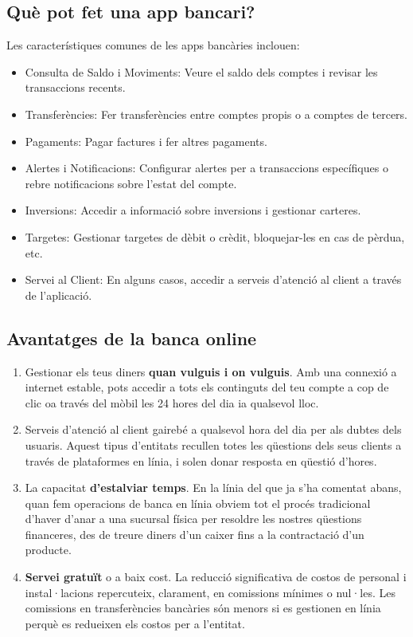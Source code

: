\subsection*{Què pot fet una app bancari?}

Les característiques comunes de les apps bancàries inclouen:

\begin{itemize}
    \item Consulta de Saldo i Moviments: Veure el saldo dels comptes i revisar les transaccions recents.
    \item Transferències: Fer transferències entre comptes propis o a comptes de tercers.
    \item  Pagaments: Pagar factures i fer altres pagaments.
    \item Alertes i Notificacions: Configurar alertes per a transaccions específiques o rebre notificacions sobre l'estat del compte.
    \item Inversions: Accedir a informació sobre inversions i gestionar carteres.
    \item Targetes: Gestionar targetes de dèbit o crèdit, bloquejar-les en cas de pèrdua, etc.
    \item Servei al Client: En alguns casos, accedir a serveis d'atenció al client a través de l'aplicació.
\end{itemize}


\subsection*{Avantatges de la banca online}


\begin{enumerate}
    \item Gestionar els teus diners \textbf{quan vulguis i on vulguis}. Amb una connexió a internet estable, pots accedir a tots els continguts del teu compte a cop de clic oa través del mòbil les 24 hores del dia ia qualsevol lloc.
    \item Serveis d'atenció al client gairebé a qualsevol hora del dia per als dubtes dels usuaris. Aquest tipus d'entitats recullen totes les qüestions dels seus clients a través de plataformes en línia, i solen donar resposta en qüestió d'hores.
    \item La capacitat \textbf{d'estalviar temps}. En la línia del que ja s'ha comentat abans, quan fem operacions de banca en línia obviem tot el procés tradicional d'haver d'anar a una sucursal física per resoldre les nostres qüestions financeres, des de treure diners d'un caixer fins a la contractació d'un producte.
    \item \textbf{Servei gratuït} o a baix cost. La reducció significativa de costos de personal i instal·lacions repercuteix, clarament, en comissions mínimes o nul·les. Les comissions en transferències bancàries són menors si es gestionen en línia perquè es redueixen els costos per a l'entitat.
\end{enumerate}




